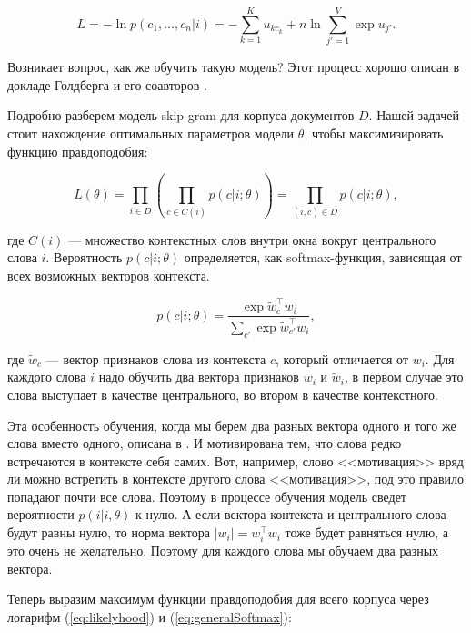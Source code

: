 \begin{equation}
 L = -\ln{p(c_1, \ldots, c_n|i)} = - \sum_{k=1}^{K} u_{kc_k} + n\ln{\sum_{j'=1}^{V} \exp{u_{j'}}}.
\end{equation}

Возникает вопрос, как же обучить такую модель? Этот процесс хорошо описан в докладе Голдберга и его соавторов
\cite{Goldberg}.

\bigskip
Подробно разберем модель skip-gram для корпуса документов $D$. Нашей задачей стоит нахождение оптимальных
параметров модели $\theta$, чтобы максимизировать функцию правдоподобия:

\begin{equation} \label{eq:likelyhood}
 L(\theta)=\prod_{i\in D}\left(\prod_{c\in C(i)} p(c|i;\theta)\right) = \prod_{(i,c)\in D}p(c|i;\theta),
\end{equation}

где $C(i)$ --- множество контекстных слов внутри окна вокруг центрального слова $i$. Вероятность $p(c|i;\theta
)$ определяется, как softmax-функция, зависящая от всех возможных векторов контекста.

\begin{equation} \label{eq:generalSoftmax}
 p(c|i;\theta) = \frac{\exp{\tilde{w}_c^\top w_i}}{\sum_{c'} \exp{\tilde{w}_{c'}^\top w_i}},
\end{equation}

где $\tilde{w}_c$ --- вектор признаков слова из контекста $c$, который отличается от $w_i$. Для каждого слова
$i$ надо обучить два вектора признаков $w_i$ и $\tilde{w}_i$, в первом случае это слова выступает в качестве
центрального, во втором в качестве контекстного.

\bigskip
Эта особенность обучения, когда мы берем два разных вектора одного и того же слова вместо одного, описана в
\cite{Goldberg}. И мотивирована тем, что слова редко встречаются в контексте себя самих. Вот, например, слово
<<мотивация>> вряд ли можно встретить в контексте другого слова <<мотивация>>, под это правило попадают почти
все слова. Поэтому в процессе обучения модель сведет вероятности $p(i|i, \theta)$ к нулю. А если вектора
контекста и центрального слова будут равны нулю, то норма вектора $|w_i| = w_i^\top w_i$ тоже будет равняться
нулю, а это очень не желательно. Поэтому для каждого слова мы обучаем два разных вектора.

\bigskip
Теперь выразим максимум функции правдоподобия для всего корпуса через логарифм (\ref{eq:likelyhood}) и
(\ref{eq:generalSoftmax}):

